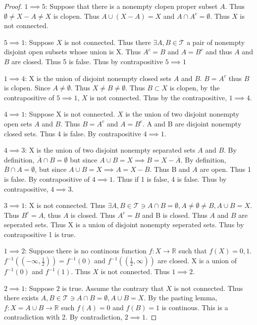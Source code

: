 \documentclass{article}
\newcommand*{\T}{\mathcal{T}}
\newcommand*{\empset}{\emptyset}
\newcommand{\R}{\mathbb{R}}
\begin{document}
\begin{proof}
    $1 \implies 5$: Suppose that there is a nonempty clopen proper subset $A$. Thus $\empset \neq X - A \neq X$ is clopen. Thus $A \cup (X - A) = X$ and $A \cap A^c = \empset$. Thus $X$ is not connected. 
    
    $5 \implies 1$: Suppose $X$ is not connected. Thus there $\exists A, B \in \T$ a pair of nonempty disjoint open subsets whose union is X. Thus $A^c = B$ and $A = B^c$ and thus $A$ and $B$ are closed. Thus 5 is false. Thus by contrapositive $5 \implies 1$

    $1 \implies 4$: X is the union of disjoint nonempty closed sets $A$ and $B$. $B = A^c$ thus $B$ is clopen. Since $A \neq \empset$. Thus $X \neq B \neq \empset$. Thus $B \subset X$ is clopen, by the contrapositive of $5 \implies 1$, $X$ is not connected. Thus by the contrapositive, $1 \implies 4$. 

    $4 \implies 1$: Suppose X is not connected. $X$ is the union of two disjoint nonempty open sets $A$ and $B$. Thus $B = A^c$ and $A = B^c$. A and B are disjoint nonempty closed sets. Thus 4 is false. By contrapositive $4 \implies 1$.        
    
    $4 \implies 3$: X is the union of two disjoint nonempty separated sets $A$ and $B$. By definition, $\overline{A} \cap B =\empset$ but since $A \cup B = X \implies B = X - \overline{A}$. By definition, $\overline{B} \cap A = \empset$, but since $A \cup B = X \implies A = X - \overline{B}$. Thus B and $A$ are open. Thus 1 is false. By contrapositive of $4 \implies 1$. Thus if 1 is false, 4 is false. Thus by contrapositive, $4 \implies 3$. 
    
    $3 \implies 1$: X is not connected. Thus $\exists A, B \in \T \ni A \cap B = \emptyset, A \neq \empset \neq B, A \cup B = X$. Thus $B^c = A$, thus $A$ is closed. Thus $A^c = B$ and B is closed. Thus $A$ and $B$ are seperated sets. Thus X is a union of disjoint nonempty seperated sets. Thus by contrapositive 1 is true.           
    
    $1 \implies 2$: Suppose there is no continous function $f: X \to \R$ such that $f(X) = {0, 1}$. $f^{-1}((-\infty, \frac{1}{2})) = f^{-1}(0)$ and $f^{-1}((\frac{1}{2}, \infty))$ are closed. X is a union of $f^{-1}(0)$ and $f^{-1}(1)$. Thus $X$ is not connected. Thus $1 \implies 2$.           

    $2 \implies 1$: Suppose $2$ is true. Assume the contrary that $X$ is not connected. Thus there exists $A, B \in \T \ni A \cap B =\empset, A \cup B = X$. By the pasting lemma, $f: X = A \cup B \to \R$ such $f(A) = 0$ and $f(B) = 1$ is continous. This is a contradiction with 2. By contradiction, $2 \implies 1$.
    

\end{proof}
\end{document}
